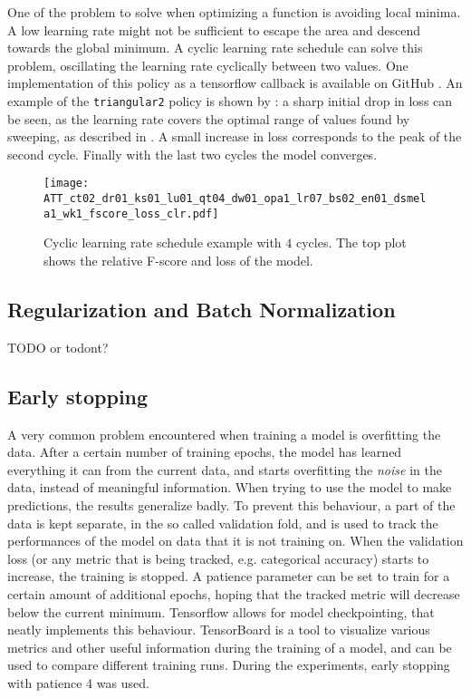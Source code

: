 One of the problem to solve when optimizing a function is avoiding local minima.
A low learning rate might not be sufficient to escape the area and descend
towards the global minimum.
A cyclic learning rate schedule \cite{smith2017cyclical} can solve this problem,
oscillating the learning rate cyclically between two values.
One implementation of this policy as a tensorflow callback is available on
GitHub \cite{bckenstlerCLR}.
An example of the \texttt{triangular2} policy is shown by
: a sharp initial drop in loss can be seen, as the
learning rate covers the optimal range of values found by sweeping, as
described in . A small increase in loss corresponds to the
peak of the second cycle. Finally with the last two cycles the model converges.

\begin{figure}[t!]
    \centering
    \texttt{[image: ATT\_ct02\_dr01\_ks01\_lu01\_qt04\_dw01\_opa1\_lr07\_bs02\_en01\_dsmela1\_wk1\_fscore\_loss\_clr.pdf]}
    \caption{Cyclic learning rate schedule example with $4$ cycles.
    The top plot shows the relative F-score and loss of the model.}%
    \label{fig:cyclic_lr_example}
\end{figure}

\subsection{Regularization and Batch Normalization}
TODO or todont?

\subsection{Early stopping}

A very common problem encountered when training a model is overfitting the
data. After a certain number of training epochs, the model has learned
everything it can from the current data, and starts overfitting the
\textit{noise} in the data, instead of meaningful information.
When trying to use the model to make predictions, the results generalize badly.
To prevent this behaviour, a part of the data is kept separate, in the so
called validation fold, and is used to track the performances of the model on
data that it is not training on.
When the validation loss (or any metric that is being tracked, e.g. categorical
accuracy) starts to increase, the training is stopped.
A patience parameter can be set to train for a certain amount of additional
epochs, hoping that the tracked metric will decrease below the current minimum.
Tensorflow allows for model checkpointing, that neatly implements this
behaviour.
TensorBoard is a tool to visualize various metrics and other useful information
during the training of a model, and can be used to compare different training
runs.
During the experiments, early stopping with patience 4 was used.

